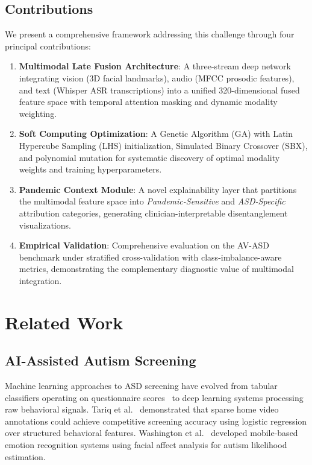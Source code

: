 \documentclass[conference]{IEEEtran}
\begin{document}
\subsection{Contributions}

We present a comprehensive framework addressing this challenge through four principal contributions:

\begin{enumerate}
    \item \textbf{Multimodal Late Fusion Architecture}: A three-stream deep network integrating vision (3D facial landmarks), audio (MFCC prosodic features), and text (Whisper ASR transcriptions) into a unified 320-dimensional fused feature space with temporal attention masking and dynamic modality weighting.

    \item \textbf{Soft Computing Optimization}: A Genetic Algorithm (GA) with Latin Hypercube Sampling (LHS) initialization, Simulated Binary Crossover (SBX), and polynomial mutation for systematic discovery of optimal modality weights and training hyperparameters.

    \item \textbf{Pandemic Context Module}: A novel explainability layer that partitions the multimodal feature space into \textit{Pandemic-Sensitive} and \textit{ASD-Specific} attribution categories, generating clinician-interpretable disentanglement visualizations.

    \item \textbf{Empirical Validation}: Comprehensive evaluation on the AV-ASD benchmark under stratified cross-validation with class-imbalance-aware metrics, demonstrating the complementary diagnostic value of multimodal integration.
\end{enumerate}

\section{Related Work}
\label{sec:related_work}

\subsection{AI-Assisted Autism Screening}

Machine learning approaches to ASD screening have evolved from tabular classifiers operating on questionnaire scores~\cite{thabtah2018machine, abbas2018multi} to deep learning systems processing raw behavioral signals. Tariq et al.~\cite{tariq2018detecting} demonstrated that sparse home video annotations could achieve competitive screening accuracy using logistic regression over structured behavioral features. Washington et al.~\cite{washington2020activity} developed mobile-based emotion recognition systems using facial affect analysis for autism likelihood estimation.
\end{document}
